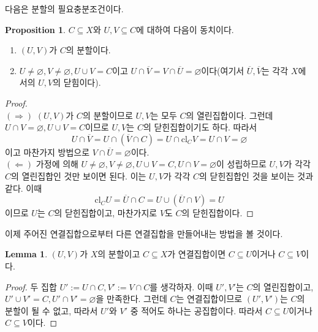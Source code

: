 \documentclass[11pt]{book}
\numberwithin{equation}{chapter}
\theoremstyle{definition}
\newtheorem{lem}[thm]{Lemma}
\newtheorem{prop}[thm]{Proposition}
\newenvironment{enum}
	{\begin{enumerate}[label=(\alph*), leftmargin=2\parindent]}
	{\end{enumerate}}
\begin{document}
다음은 분할의 필요충분조건이다.
\begin{prop}
    \(C \subseteq X\)와 \(U, V \subseteq C\)에 대하여 다음이 동치이다.
    \begin{enum}
        \item \((U, V)\)가 \(C\)의 분할이다.
        \item \(U \ne \varnothing, V \ne \varnothing, U \cup V = C\)이고 \(U \cap \overline{V} = V \cap \overline{U} = \varnothing\)이다(여기서 \(\overline{U}, \overline{V}\)는 각각 \(X\)에서의 \(U, V\)의 닫힘이다).
    \end{enum}
\end{prop}
\begin{proof}
    \quad\\
    \((\Rightarrow)\) \((U, V)\)가 \(C\)의 분할이므로 \(U, V\)는 모두 \(C\)의 열린집합이다. 그런데 \(U \cap V = \varnothing, U \cup V = C\)이므로 \(U, V\)는 \(C\)의 닫힌집합이기도 하다. 따라서
    \[
    U \cap \overline{V} = U \cap (\overline{V} \cap C) = U \cap \text{cl}_C V = U \cap V = \varnothing 
    \]
    이고 마찬가지 방법으로 \(V \cap \overline{U} = \varnothing\)이다.\\
    \((\Leftarrow)\) 가정에 의해 \(U \ne \varnothing, V \ne \varnothing, U \cup V = C, U \cap V = \varnothing\)이 성립하므로 \(U, V\)가 각각 \(C\)의 열린집합인 것만 보이면 된다. 이는 \(U, V\)가 각각 \(C\)의 닫힌집합인 것을 보이는 것과 같다. 이때
    \[
    \text{cl}_C U = \overline{U} \cap C = U \cup (\overline{U} \cap V) = U    
    \]
    이므로 \(U\)는 \(C\)의 닫힌집합이고, 마찬가지로 \(V\)도 \(C\)의 닫힌집합이다.
\end{proof}

이제 주어진 연결집합으로부터 다른 연결집합을 만들어내는 방법을 볼 것이다.

\begin{lem} \label{lem 6.4.4}
    \((U, V)\)가 \(X\)의 분할이고 \(C \subseteq X\)가 연결집합이면 \(C \subseteq U\)이거나 \(C \subseteq V\)이다.
\end{lem}
\begin{proof}
    두 집합 \(U' := U \cap C, V' := V \cap C\)를 생각하자. 이때 \(U', V'\)는 \(C\)의 열린집합이고, \(U' \cup V' = C, U' \cap V' = \varnothing\)을 만족한다. 그런데 \(C\)는 연결집합이므로 \((U', V')\)는 \(C\)의 분할이 될 수 없고, 따라서 \(U'\)와 \(V'\) 중 적어도 하나는 공집합이다. 따라서 \(C \subseteq U\)이거나 \(C \subseteq V\)이다.
\end{proof}
\end{document}
